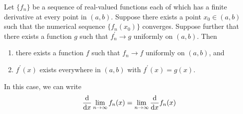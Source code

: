 \documentclass[thmcnt=section, 12pt]{my-elegantbook}
\begin{document}
\begin{theorem} \label{thm:44}
    Let $\{f_n\}$ be a sequence of real-valued functions each of which has a finite derivative at every point in $(a, b)$. Suppose there exists a point $x_0 \in (a, b)$ such that the numerical sequence $\{f_n(x_0)\}$ converges. Suppose further that there exists a function $g$ such that $f^\prime_n \to g$ uniformly on $(a, b)$. Then 
    \begin{enumerate}
        \item there exists a function $f$ such that $f_n \to f$ uniformly on $(a, b)$, and
        \item $f^\prime(x)$ exists everywhere in $(a, b)$ with $f^\prime(x) = g(x)$.
    \end{enumerate}
    In this case, we can write
    \begin{align*}
        \odvs{\lim_{n \to \infty} f_n(x)}{x}
        = \lim_{n \to \infty} \odvs{f_n(x)}{x}
    \end{align*}
\end{theorem}
\end{document}
